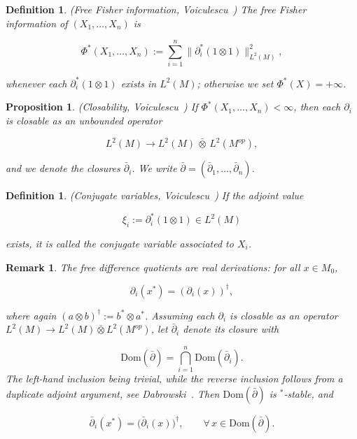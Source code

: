\documentclass[10pt,a4paper,reqno]{amsart}
\newtheorem{definition}[theorem]{Definition}
\newtheorem{proposition}[theorem]{Proposition}
\newtheorem{remark}[theorem]{Remark}
\newcommand{\Dom}{\mathrm{Dom}}
\begin{document}
\begin{definition}(Free Fisher information, Voiculescu~\cite[Definition~6.1]{V})
The \emph{free Fisher information} of $(X_1,\ldots,X_n)$ is


\[
\Phi^\ast(X_1,\ldots,X_n)
   := \sum_{i=1}^n \big\|\partial_i^\ast(1\otimes 1)\big\|_{L^2(M)}^2,
\]


whenever each $\partial_i^\ast(1\otimes 1)$ exists in $L^2(M)$; otherwise
we set $\Phi^\ast(X)=+\infty$.
\end{definition}

\begin{proposition}(Closability, Voiculescu~\cite[Lemma~3.3]{V})
If $\Phi^\ast(X_1,\ldots,X_n)<\infty$, then each $\partial_i$ is closable as
an unbounded operator


\[
L^2(M)\longrightarrow L^2(M)\,\bar\otimes\,L^2(M^{op}),
\]


and we denote the closures $\bar\partial_i$.  We write
$\bar\partial=(\bar\partial_1,\ldots,\bar\partial_n)$.
\end{proposition}

\begin{definition}(Conjugate variables, Voiculescu~\cite[Definition~3.1]{V})
If the adjoint value


\[
\xi_i := \partial_i^\ast(1\otimes 1)\in L^2(M)
\]


exists, it is called the \emph{conjugate variable} associated to $X_i$.
\end{definition}

\begin{remark}
The free difference quotients are \emph{real} derivations: for all $x\in M_0$,


\[
\partial_i(x^\ast) = (\partial_i(x))^{\dagger},
\]


where again $(a\otimes b)^{\dagger} := b^\ast \otimes a^\ast$.
Assuming each $\partial_i$ is closable as an operator
$L^2(M)\to L^2(M)\bar\otimes L^2(M^{op})$, let $\bar\partial_i$ denote its
closure with 


\[
\Dom(\bar\partial) = \bigcap_{i=1}^n \Dom(\bar\partial_i).
\]
The left-hand inclusion being trivial, while the reverse inclusion follows from a duplicate adjoint argument, see Dabrowski~\cite{Dab10}.
\bigskip
Then $\Dom(\bar\partial)$ is $^\ast$‑stable, and


\[
\bar\partial_i(x^\ast) = \big(\bar\partial_i(x)\big)^{\dagger},
\qquad \forall\, x\in \Dom(\bar\partial).
\]


\end{remark}
\end{document}
